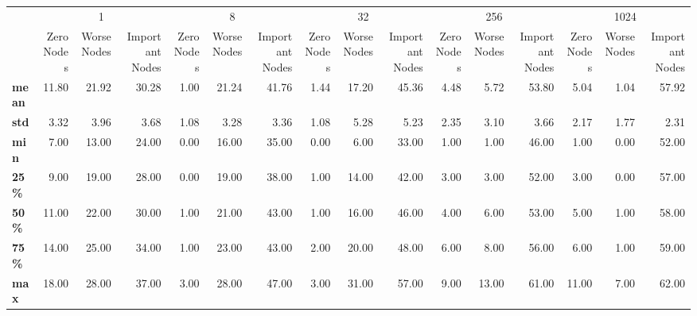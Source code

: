 \begin{tabular}{lrrrrrrrrrrrrrrr}
\toprule
{} & \multicolumn{3}{c}{1} & \multicolumn{3}{c}{8} & \multicolumn{3}{c}{32} & \multicolumn{3}{c}{256} & \multicolumn{3}{c}{1024} \\
{} & Zero Nodes & Worse Nodes & Important Nodes & Zero Nodes & Worse Nodes & Important Nodes & Zero Nodes & Worse Nodes & Important Nodes & Zero Nodes & Worse Nodes & Important Nodes & Zero Nodes & Worse Nodes & Important Nodes \\
\midrule
\textbf{mean} &      11.80 &       21.92 &           30.28 &       1.00 &       21.24 &           41.76 &       1.44 &       17.20 &           45.36 &       4.48 &        5.72 &           53.80 &       5.04 &        1.04 &           57.92 \\
\textbf{std } &       3.32 &        3.96 &            3.68 &       1.08 &        3.28 &            3.36 &       1.08 &        5.28 &            5.23 &       2.35 &        3.10 &            3.66 &       2.17 &        1.77 &            2.31 \\
\textbf{min } &       7.00 &       13.00 &           24.00 &       0.00 &       16.00 &           35.00 &       0.00 &        6.00 &           33.00 &       1.00 &        1.00 &           46.00 &       1.00 &        0.00 &           52.00 \\
\textbf{25\% } &       9.00 &       19.00 &           28.00 &       0.00 &       19.00 &           38.00 &       1.00 &       14.00 &           42.00 &       3.00 &        3.00 &           52.00 &       3.00 &        0.00 &           57.00 \\
\textbf{50\% } &      11.00 &       22.00 &           30.00 &       1.00 &       21.00 &           43.00 &       1.00 &       16.00 &           46.00 &       4.00 &        6.00 &           53.00 &       5.00 &        1.00 &           58.00 \\
\textbf{75\% } &      14.00 &       25.00 &           34.00 &       1.00 &       23.00 &           43.00 &       2.00 &       20.00 &           48.00 &       6.00 &        8.00 &           56.00 &       6.00 &        1.00 &           59.00 \\
\textbf{max } &      18.00 &       28.00 &           37.00 &       3.00 &       28.00 &           47.00 &       3.00 &       31.00 &           57.00 &       9.00 &       13.00 &           61.00 &      11.00 &        7.00 &           62.00 \\
\bottomrule
\end{tabular}
